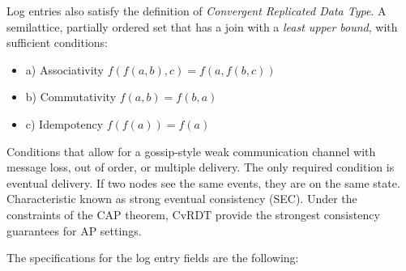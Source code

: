 \documentclass{sig-alternate}
\begin{document}
Log entries also satisfy the definition of \textit{Convergent Replicated Data Type}. A semilattice, partially ordered set that has a join with a \textit{least upper bound}, with sufficient conditions:

\begin{itemize}
 \item a) Associativity $f(f(a, b), c) = f(a, f(b, c))$
 \item b) Commutativity $f(a, b) = f(b, a)$
 \item c) Idempotency $f(f(a)) = f(a)$
\end{itemize}

Conditions that allow for a gossip-style weak communication channel with message loss, out of order, or multiple delivery. The only required condition is eventual delivery. If two nodes see the same events, they are on the same state. Characteristic known as strong eventual consistency (SEC). Under the constraints of the CAP theorem, CvRDT provide the strongest consistency guarantees for AP settings.

The specifications for the log entry fields are the following:
\end{document}
